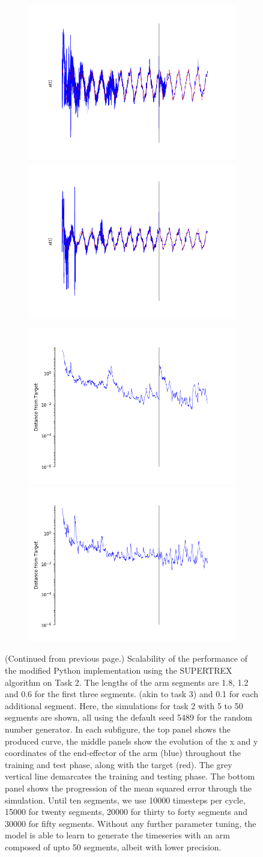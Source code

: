 \begin{figure}
\begin{subfigure}{\textwidth}
            \includegraphics[trim=2cm 0cm 0cm 0cm, clip=true,height=0.1\linewidth,width=.45\linewidth]{Figures/Improv/ST_T2_Seg40_Var_CoordinateX.png}    
            \includegraphics[trim=2cm 0cm 0cm 0cm, clip=true,height=0.1\linewidth,width=.45\linewidth]{Figures/Improv/ST_T2_Seg50_Var_CoordinateX.png}         
            
            \includegraphics[trim=1cm 0cm 0cm 0cm, clip=true,height=0.1\linewidth,width=.45\linewidth]{Figures/Improv/ST_T2_Seg40_Var_MSE.png}
            \includegraphics[trim=1cm 0cm 0cm 0cm, clip=true,height=0.1\linewidth,width=.45\linewidth]{Figures/Improv/ST_T2_Seg50_Var_MSE.png}
            
        \end{subfigure}
    


    \caption{(Continued from previous page.) Scalability of the performance of the modified Python implementation using the SUPERTREX algorithm on Task 2. The lengths of the arm segments are 1.8, 1.2 and 0.6 for the first three segments. (akin to task 3) and 0.1 for each additional segment. Here, the simulations for task 2 with 5 to 50 segments are shown, all using the default seed 5489 for the random number generator. In each subfigure, the top panel shows the produced curve, the middle panels show the evolution of the x and y coordinates of the end-effector of the arm (blue) throughout the training and test phase, along with the target (red). The grey vertical line demarcates the training and testing phase. The bottom panel shows the progression of the mean squared error through the simulation. Until ten segments, we use 10000 timesteps per cycle, 15000 for twenty segments, 20000 for thirty to forty segments and 30000 for fifty segments. Without any further parameter tuning, the model is able to learn to generate the timeseries with an arm composed of upto 50 segments, albeit with lower precision.}
    \label{Fig:Scalability_Task2_cont}

\end{figure}



